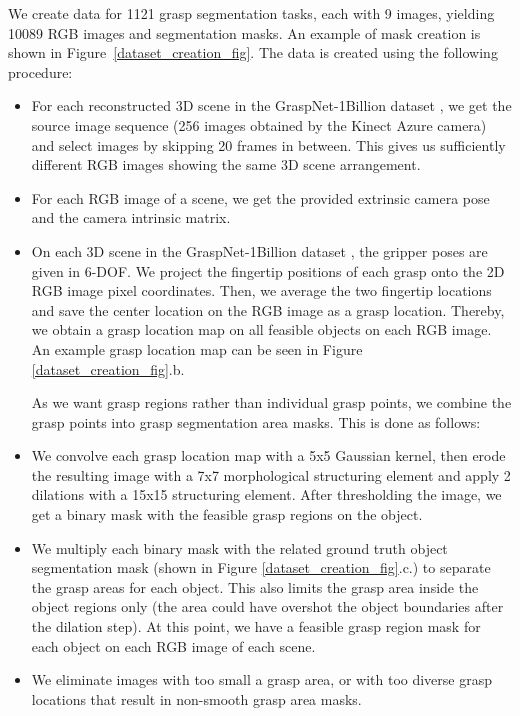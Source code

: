 \documentclass[letterpaper]{article} %
\begin{document}
We create data for 1121 grasp segmentation tasks, each with 9 images, yielding 10089 RGB images and segmentation masks. An example of mask creation is shown in Figure~\ref{dataset_creation_fig}. The data is created using the following procedure:
\begin{itemize}

\item  For each reconstructed 3D scene in the GraspNet-1Billion dataset \cite{fang2020graspnet}, we get the source image sequence (256 images obtained by the Kinect Azure camera) and select images by skipping 20 frames in between. This gives us sufficiently different RGB images showing the same 3D scene arrangement. 
\item  For each RGB image of a scene, we get the provided extrinsic camera pose and the camera intrinsic matrix. 
\item On each 3D scene in the GraspNet-1Billion dataset \cite{fang2020graspnet}, the gripper poses are given in 6-DOF. We project the fingertip positions of each grasp onto the 2D RGB image pixel coordinates. Then, we average the two fingertip locations and save the center location on the RGB image as a grasp location. Thereby, we obtain a grasp location map on all feasible objects on each RGB image. An example grasp location map can be seen in Figure \ref{dataset_creation_fig}.b.

As we want grasp regions rather than individual grasp points, we combine the grasp points into grasp segmentation area masks. This is done as follows: 

\item We convolve each grasp location map with a 5x5 Gaussian kernel, then erode the resulting image with a 7x7 morphological structuring element and apply 2 dilations with a 15x15 structuring element. After thresholding the image, we get a binary mask with the feasible grasp regions on the object.

\item We multiply each binary mask with the related ground truth object segmentation mask (shown in Figure \ref{dataset_creation_fig}.c.) to separate the grasp areas for each object. This also limits the grasp area inside the object regions only (the area could have overshot the object boundaries after the dilation step).  At this point, we have a feasible grasp region mask for each object on each RGB image of each scene. 

\item We eliminate images with too small a grasp area, or with too diverse grasp locations that result in non-smooth grasp area masks. 
\end{itemize}
\end{document}
